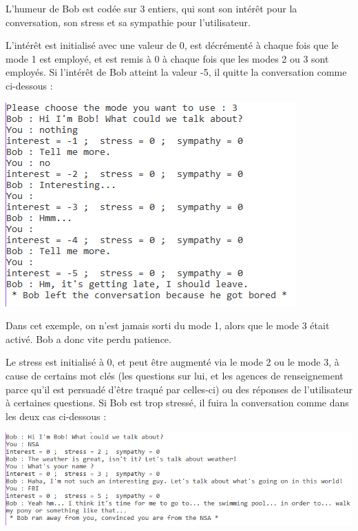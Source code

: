 \documentclass[paper=a4, 12pt]{report}
\begin{document}
\vspace{0.5cm}

L’humeur de Bob est codée sur 3 entiers, qui sont son intérêt pour la conversation, son stress et sa sympathie pour l’utilisateur.

\vspace{0.5cm}

L’intérêt est initialisé avec une valeur de 0, est décrémenté à chaque fois que le mode 1 est employé, et est remis à 0 à chaque fois que les modes 2 ou 3 sont employés. Si l’intérêt de Bob atteint la valeur -5, il quitte la conversation comme ci-dessous :

\vspace{0.5cm}

\includegraphics[scale=0.5]{screen2.png}

\vspace{0.5cm}

Dans cet exemple, on n’est jamais sorti du mode 1, alors que le mode 3 était activé. Bob a donc vite perdu patience.

\vspace{0.5cm}

Le stress est initialisé à 0, et peut être augmenté via le mode 2 ou le mode 3, à cause de certains mot clés (les questions sur lui, et les agences de renseignement parce qu’il est persuadé d’être traqué par celles-ci) ou des réponses de l’utilisateur à certaines questions. Si Bob est trop stressé, il fuira la conversation comme dans les deux cas ci-dessous :

\vspace{0.5cm}

\includegraphics[scale=0.5]{screen3.png}
\end{document}
